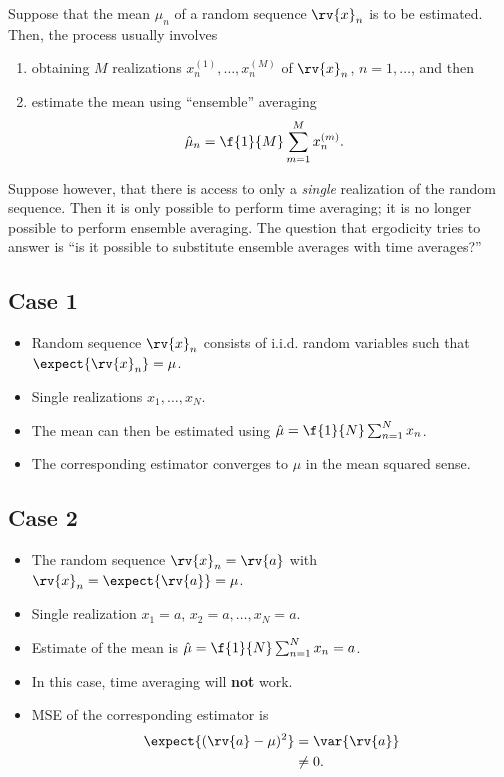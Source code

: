 Suppose that the mean $\mu_{n}$ of a random sequence $\rv{x}_{n}$ is to be estimated. Then, the process usually involves
\begin{enumerate}
    \item obtaining $M$ realizations $x^{(1)}_{n}, \ldots, x_{n}^{(M)}$ of $\rv{x}_{n}$, $n=1,\ldots$, and then
    \item estimate the mean using ``ensemble'' averaging
    \begin{align}
        \hat{\mu}_{n} &= \f{1}{M} \sum_{m=1}^{M}x_{n}^{(m)}.
    \end{align}
\end{enumerate}
Suppose however, that there is access to only a \emph{single} realization of the random sequence. Then it is only possible to perform time averaging; it is no longer possible to perform ensemble averaging. The question that ergodicity tries to answer is ``is it possible to substitute ensemble averages with time averages?''

\subsection*{Case 1}
\begin{itemize}
    \item Random sequence $\rv{x}_{n}$ consists of i.i.d. random variables such that $\expect{\rv{x}_{n}}=\mu$.
    \item Single realizations $x_{1}, \ldots, x_{N}$.
    \item The mean can then be estimated using $\hat{\mu}=\f{1}{N}\sum_{n=1}^{N}x_{n}$.
    \item The corresponding estimator converges to $\mu$ in the mean squared sense.
\end{itemize}

\subsection*{Case 2}
\begin{itemize}
    \item The random sequence $\rv{x}_{n} = \rv{a}$ with $\rv{x}_{n}=\expect{\rv{a}}=\mu$.
    \item Single realization $x_{1}=a$, $x_{2}=a, \ldots, x_{N}=a$.
    \item Estimate of the mean is $\hat{\mu}=\f{1}{N}\sum_{n=1}^{N}x_{n}=a$.
    \item In this case, time averaging will \textbf{not} work.
    \item MSE of the corresponding estimator is
    \begin{align}
        \expect{(\rv{a}-\mu)^{2}} &= \var{\rv{a}} \\
        &\neq 0.
    \end{align}
\end{itemize}

